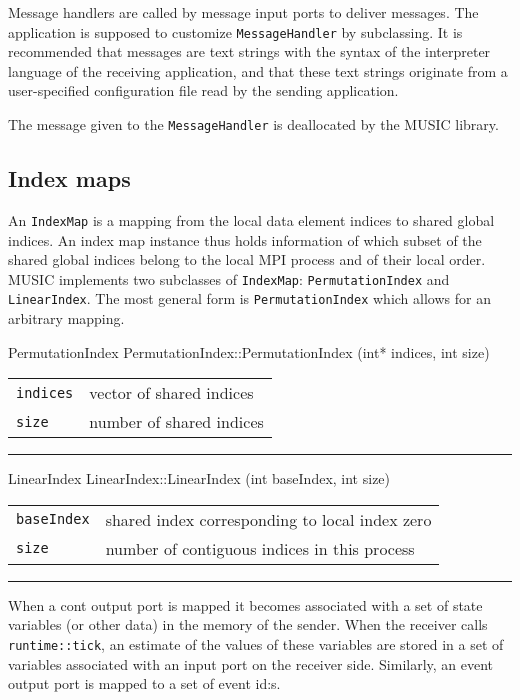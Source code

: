 \documentclass[a4paper,twoside]{report}
\makeatletter
\newenvironment{parameters}%
{\begin{tabular}{@{\hspace{2em}}lp{0.6\textwidth}}}%
{\end{tabular}\par\vspace{1mm}\par\hrule\par\vspace{5mm}}
\makeatother
\begin{document}
Message handlers are called by message input ports to deliver
messages.  The application is supposed to customize
\lstinline|MessageHandler| by subclassing.  It is recommended that
messages are text strings with the syntax of the interpreter language
of the receiving application, and that these text strings originate
from a user-specified configuration file read by the sending
application.

The message given to the \lstinline|MessageHandler| is deallocated by
the MUSIC library.


\subsection{Index maps}

An \lstinline|IndexMap| is a mapping from the local data element
indices to shared global indices.  An index map instance thus holds
information of which subset of the shared global indices belong to the
local MPI process and of their local order.  MUSIC implements two
subclasses of \lstinline|IndexMap|: \lstinline|PermutationIndex| and
\lstinline|LinearIndex|.  The most general form is
\lstinline|PermutationIndex| which allows for an arbitrary mapping.

\begin{head}{PermutationIndex}
  PermutationIndex::PermutationIndex (int* indices,
                                      int size)
\end{head}
\begin{parameters}
  \lstinline|indices| & vector of shared indices \\
  \lstinline|size| & number of shared indices \\
\end{parameters}

\begin{head}{LinearIndex}
  LinearIndex::LinearIndex (int baseIndex, int size)
\end{head}
\begin{parameters}
  \lstinline|baseIndex| & shared index corresponding to local index zero \\
  \lstinline|size| & number of contiguous indices in this process \\
\end{parameters}

When a cont output port is mapped it becomes associated with a set of
state variables (or other data) in the memory of the sender.  When the
receiver calls \lstinline|runtime::tick|, an estimate of the values
of these variables are stored in a set of variables associated with an
input port on the receiver side.  Similarly, an event output port is
mapped to a set of event id:s.
\end{document}
